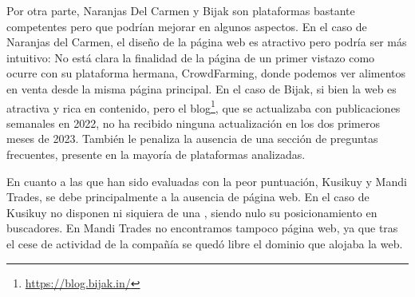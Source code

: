 Por otra parte, Naranjas Del Carmen y Bijak son plataformas bastante competentes pero que podrían mejorar en algunos aspectos. En el caso de Naranjas del Carmen, el diseño de la página web es atractivo pero podría ser más intuitivo: No está clara la finalidad de la página de un primer vistazo como ocurre con su plataforma hermana, CrowdFarming, donde podemos ver alimentos en venta desde la misma página principal. En el caso de Bijak, si bien la web es atractiva y rica en contenido, pero el blog\footnote{\url{https://blog.bijak.in/}}, que se actualizaba con publicaciones semanales en 2022, no ha recibido ninguna actualización en los dos primeros meses de 2023. También le penaliza la ausencia de una sección de preguntas frecuentes, presente en la mayoría de plataformas analizadas. 

En cuanto a las que han sido evaluadas con la peor puntuación, Kusikuy y Mandi Trades, se debe principalmente a la ausencia de página web. En el caso de Kusikuy no disponen ni siquiera de una , siendo nulo su posicionamiento en buscadores. En Mandi Trades no encontramos tampoco página web, ya que tras el cese de actividad de la compañía se quedó libre el dominio que alojaba la web.